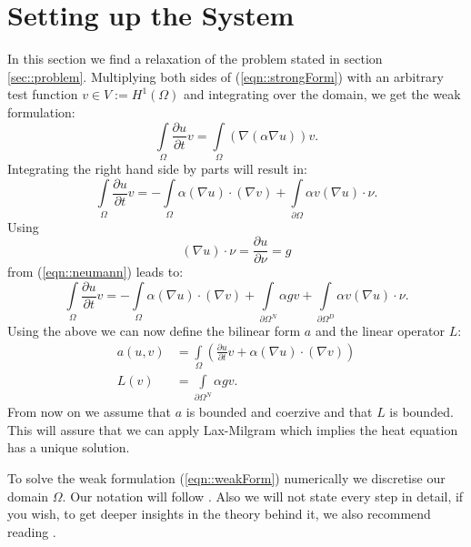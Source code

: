 
\section{\label{sec::setupSystem}Setting up the System}
In this section we find a relaxation of the problem stated in section \ref{sec::problem}. Multiplying both sides of (\ref{eqn::strongForm}) with an arbitrary test function $v\in V:=H^1(\Omega)$ and integrating over the domain, we get the weak formulation:
\begin{equation*}
        \int\limits_{\Omega} \frac{\partial u}{\partial t} v = \int\limits_{\Omega} (\nabla(\alpha\nabla u)) v.
\end{equation*}
Integrating the right hand side by parts will result in:
\begin{equation*}
        \int\limits_{\Omega} \frac{\partial u}{\partial t} v = -\int\limits_{\Omega} \alpha(\nabla u) \cdot (\nabla v) + \int\limits_{\partial \Omega} \alpha v (\nabla u) \cdot \nu.
\end{equation*}
Using
\begin{equation*}
        (\nabla u)\cdot \nu = \frac{\partial u}{\partial \nu} = g
\end{equation*}
from (\ref{eqn::neumann}) leads to:
\begin{equation}
        \label{eqn::weakForm}
        \int\limits_{\Omega} \frac{\partial u}{\partial t} v = -\int\limits_{\Omega} \alpha(\nabla u) \cdot (\nabla v) +  \int\limits_{\partial\Omega^N} \alpha gv + \int\limits_{\partial \Omega^D} \alpha v (\nabla u) \cdot \nu.
\end{equation}
Using the above we can now define the bilinear form $a$ and the linear operator $L$:
\begin{align*}
        a(u,v)&=\int\limits_{\Omega} \left(\frac{\partial u}{\partial t} v +  \alpha(\nabla u) \cdot (\nabla v) \right) \\
        L(v) &= \int\limits_{\partial\Omega^N} \alpha gv.
\end{align*}
From now on we assume that $a$ is bounded and coerzive and that $L$ is bounded. This will assure that we can apply Lax-Milgram \cite{quarteroni2009numerical} which implies the heat equation has a unique solution.

To solve the weak formulation (\ref{eqn::weakForm}) numerically we discretise our domain $\Omega$. Our notation will follow \cite{quarteroni2009numerical}. Also we will not state every step in detail, if you wish, to get deeper insights in the theory behind it, we also recommend reading \cite{quarteroni2009numerical}.

